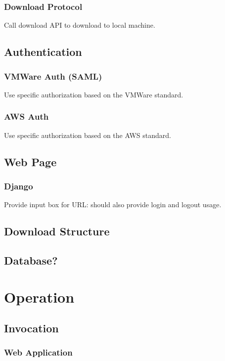 \documentclass{article}
\begin{document}
            \subsubsection{Download Protocol}
            Call download API to download to local machine.

        \subsection{Authentication}
            \subsubsection{VMWare Auth (SAML)}
            Use specific authorization based on the VMWare standard.

            \subsubsection{AWS Auth}
            Use specific authorization based on the AWS standard.

        \subsection{Web Page}
            \subsubsection{Django}
            Provide input box for URL: should also provide login and logout usage.

        \subsection{Download Structure}

        \subsection{Database?}

    \section{Operation}
        \subsection{Invocation}
            \subsubsection{Web Application}
\end{document}
